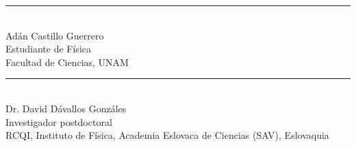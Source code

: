 \documentclass[onecolumn,11pt]{article}
\begin{document}
\begin{center}
    \rule{200pt}{0.4pt}\\
    Adán Castillo Guerrero \\
    Estudiante de Física \\
    Facultad de Ciencias, UNAM \\
    
\end{center}

\vspace{1.0cm}

\begin{center}
    \rule{200pt}{0.4pt}\\
    Dr. David Dávallos Gonzáles \\
    Investigador postdoctoral \\
    RCQI, Instituto de Física, Academia Eslovaca de Ciencias (SAV), Eslovaquia\\
    
\end{center}


\end{document}
